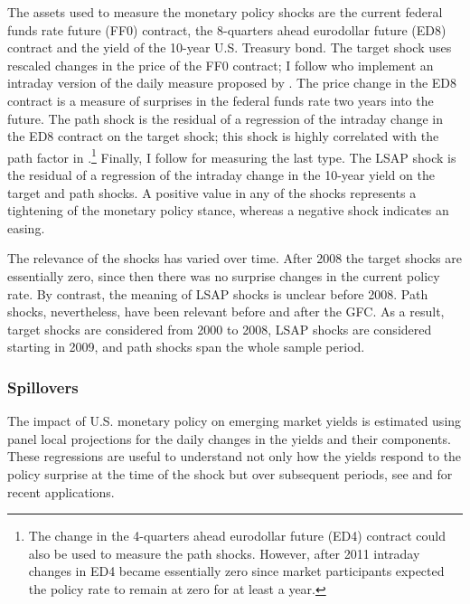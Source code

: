 {The assets used to measure the monetary policy shocks are the current federal funds rate future (FF0) contract, the 8-quarters ahead eurodollar future (ED8) contract and the yield of the 10-year U.S. Treasury bond.
The target shock uses rescaled changes in the price of the FF0 contract; I follow \cite{GSS:2005a} who implement an intraday version of the daily measure proposed by \cite{Kuttner:2001}.
The price change in the ED8 contract is a measure of surprises in the federal funds rate two years into the future.
The path shock is the residual of a regression of the intraday change in the ED8 contract on the target shock; this shock is highly correlated with the path factor in \cite{GSS:2005a}.\footnote{ The change in the 4-quarters ahead eurodollar future (ED4) contract could also be used to measure the path shocks. However, after 2011 intraday changes in ED4 became essentially zero since market participants expected the policy rate to remain at zero for at least a year.}
Finally, I follow \cite{Swanson:2018} for measuring the last type. %
The LSAP shock is the residual of a regression of the intraday change in the 10-year yield on the target and path shocks.
A positive value in any of the shocks represents a tightening of the monetary policy stance, whereas a negative shock indicates an easing.


The relevance of the shocks has varied over time.
After 2008 the target shocks are essentially zero, since then there was no surprise changes in the current policy rate.
By contrast, the meaning of LSAP shocks is unclear before 2008.
Path shocks, nevertheless, have been relevant before and after the GFC.
As a result, target shocks are considered from 2000 to 2008, LSAP shocks are considered starting in 2009, and path shocks span the whole sample period.


\subsubsection{Spillovers} \label{sec:LPs}
\iftoggle{toclinks}{\gototoc}{} %

The impact of U.S. monetary policy on emerging market yields is estimated using panel local projections for the daily changes in the yields and their components.
These regressions are useful to understand not only how the yields respond to the policy surprise at the time of the shock but over subsequent periods, see \cite{HofmannShimShin:2019} and \cite{ACDM:2019} for recent applications.

}
